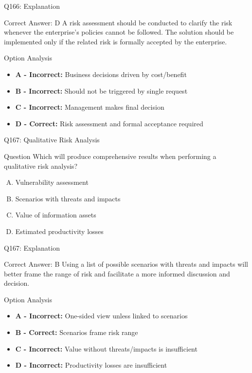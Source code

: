 \documentclass{beamer}
\begin{document}
	\begin{frame}{Q166: Explanation}
		\begin{block}{Correct Answer: D}
			A risk assessment should be conducted to clarify the risk whenever the enterprise's policies cannot be followed. The solution should be implemented only if the related risk is formally accepted by the enterprise.
		\end{block}
		\begin{block}{Option Analysis}
			\begin{itemize}
				\item \textbf{A - Incorrect:} Business decisions driven by cost/benefit
				\item \textbf{B - Incorrect:} Should not be triggered by single request
				\item \textbf{C - Incorrect:} Management makes final decision
				\item \textbf{D - Correct:} Risk assessment and formal acceptance required
			\end{itemize}
		\end{block}
	\end{frame}
	
	\begin{frame}{Q167: Qualitative Risk Analysis}
		\begin{block}{Question}
			Which will produce comprehensive results when performing a qualitative risk analysis?
		\end{block}
		\begin{enumerate}[(A)]
			\item Vulnerability assessment
			\item Scenarios with threats and impacts
			\item Value of information assets
			\item Estimated productivity losses
		\end{enumerate}
	\end{frame}
	
	\begin{frame}{Q167: Explanation}
		\begin{block}{Correct Answer: B}
			Using a list of possible scenarios with threats and impacts will better frame the range of risk and facilitate a more informed discussion and decision.
		\end{block}
		\begin{block}{Option Analysis}
			\begin{itemize}
				\item \textbf{A - Incorrect:} One-sided view unless linked to scenarios
				\item \textbf{B - Correct:} Scenarios frame risk range
				\item \textbf{C - Incorrect:} Value without threats/impacts is insufficient
				\item \textbf{D - Incorrect:} Productivity losses are insufficient
			\end{itemize}
		\end{block}
	\end{frame}
	
\end{document}
